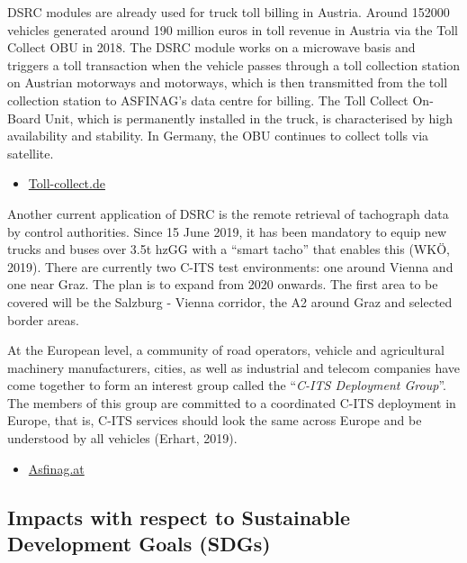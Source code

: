 \documentclass[
]{book}
\providecommand{\tightlist}{%
  \setlength{\itemsep}{0pt}\setlength{\parskip}{0pt}}
\begin{document}
DSRC modules are already used for truck toll billing in Austria. Around 152000 vehicles generated around 190 million euros in toll revenue in Austria via the Toll Collect OBU in 2018. The DSRC module works on a microwave basis and triggers a toll transaction when the vehicle passes through a toll collection station on Austrian motorways and motorways, which is then transmitted from the toll collection station to ASFINAG's data centre for billing. The Toll Collect On-Board Unit, which is permanently installed in the truck, is characterised by high availability and stability. In Germany, the OBU continues to collect tolls via satellite.

\begin{itemize}
\tightlist
\item
  \href{https://www.toll-collect.de/de/toll_collect/unternehmen/presse/pressemitteilungen/detailseite_press_6241.html}{Toll-collect.de}
\end{itemize}

Another current application of DSRC is the remote retrieval of tachograph data by control authorities. Since 15 June 2019, it has been mandatory to equip new trucks and buses over 3.5t hzGG with a ``smart tacho'' that enables this (WKÖ, 2019). There are currently two C-ITS test environments: one around Vienna and one near Graz. The plan is to expand from 2020 onwards. The first area to be covered will be the Salzburg - Vienna corridor, the A2 around Graz and selected border areas.

At the European level, a community of road operators, vehicle and agricultural machinery manufacturers, cities, as well as industrial and telecom companies have come together to form an interest group called the ``\emph{C-ITS Deployment Group}''. The members of this group are committed to a coordinated C-ITS deployment in Europe, that is, C-ITS services should look the same across Europe and be understood by all vehicles (Erhart, 2019).

\begin{itemize}
\tightlist
\item
  \href{https://blog.asfinag.at/technik-innovation/c-its-vernetzte-autos-intelligenter-verkehr/}{Asfinag.at}
\end{itemize}

\hypertarget{impacts-with-respect-to-sustainable-development-goals-sdgs-41}{%
\subsection*{Impacts with respect to Sustainable Development Goals (SDGs)}\label{impacts-with-respect-to-sustainable-development-goals-sdgs-41}}
\end{document}
